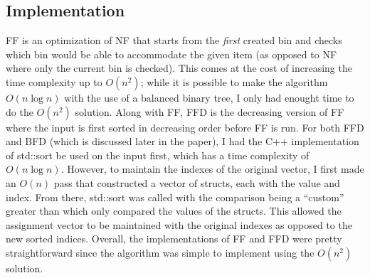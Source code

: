 \documentclass{article}
\begin{document}
\subsection{Implementation}
    FF is an optimization of NF that starts from the \textit{first} created bin
    and checks which bin would be able to accommodate the given item (as 
    opposed to NF where only the current bin is checked). This comes at the 
    cost of increasing the time complexity up to $O(n^2)$; while it is possible
    to make the algorithm $O(n\log{n})$ with the use of a balanced binary tree,
    I only had enought time to do the $O(n^2)$ solution.
    \nextblurb
    Along with FF, FFD is the decreasing version of FF where the input is first
    sorted in decreasing order before FF is run. For both FFD and BFD (which is
    discussed later in the paper), I had the C++ implementation of std::sort
    be used on the input first, which has a time complexity of $O(n\log{n})$.
    However, to maintain the indexes of the original vector, I first made an
    $O(n)$ pass that constructed a vector of structs, each with the value and
    index. From there, std::sort was called with the comparison being a
    ``custom'' greater than which only compared the values of the structs. This
    allowed the assignment vector to be maintained with the original indexes as
    opposed to the new sorted indices.
    \nextblurb
    Overall, the implementations of FF and FFD were pretty straightforward since
    the algorithm was simple to implement using the $O(n^2)$ solution.
\end{document}
